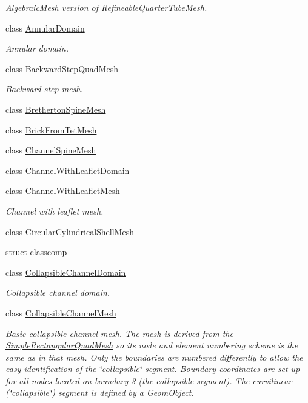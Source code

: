 \begin{DoxyCompactItemize}
\begin{DoxyCompactList}\small\item\em Algebraic\+Mesh version of \hyperlink{classoomph_1_1RefineableQuarterTubeMesh}{Refineable\+Quarter\+Tube\+Mesh}. \end{DoxyCompactList}\item 
class \hyperlink{classoomph_1_1AnnularDomain}{Annular\+Domain}
\begin{DoxyCompactList}\small\item\em Annular domain. \end{DoxyCompactList}\item 
class \hyperlink{classoomph_1_1BackwardStepQuadMesh}{Backward\+Step\+Quad\+Mesh}
\begin{DoxyCompactList}\small\item\em Backward step mesh. \end{DoxyCompactList}\item 
class \hyperlink{classoomph_1_1BrethertonSpineMesh}{Bretherton\+Spine\+Mesh}
\item 
class \hyperlink{classoomph_1_1BrickFromTetMesh}{Brick\+From\+Tet\+Mesh}
\item 
class \hyperlink{classoomph_1_1ChannelSpineMesh}{Channel\+Spine\+Mesh}
\item 
class \hyperlink{classoomph_1_1ChannelWithLeafletDomain}{Channel\+With\+Leaflet\+Domain}
\item 
class \hyperlink{classoomph_1_1ChannelWithLeafletMesh}{Channel\+With\+Leaflet\+Mesh}
\begin{DoxyCompactList}\small\item\em Channel with leaflet mesh. \end{DoxyCompactList}\item 
class \hyperlink{classoomph_1_1CircularCylindricalShellMesh}{Circular\+Cylindrical\+Shell\+Mesh}
\item 
struct \hyperlink{structoomph_1_1classcomp}{classcomp}
\item 
class \hyperlink{classoomph_1_1CollapsibleChannelDomain}{Collapsible\+Channel\+Domain}
\begin{DoxyCompactList}\small\item\em Collapsible channel domain. \end{DoxyCompactList}\item 
class \hyperlink{classoomph_1_1CollapsibleChannelMesh}{Collapsible\+Channel\+Mesh}
\begin{DoxyCompactList}\small\item\em Basic collapsible channel mesh. The mesh is derived from the {\ttfamily \hyperlink{classoomph_1_1SimpleRectangularQuadMesh}{Simple\+Rectangular\+Quad\+Mesh}} so it\textquotesingle{}s node and element numbering scheme is the same as in that mesh. Only the boundaries are numbered differently to allow the easy identification of the \char`\"{}collapsible\char`\"{} segment. Boundary coordinates are set up for all nodes located on boundary 3 (the collapsible segment). The curvilinear (\char`\"{}collapsible\char`\"{}) segment is defined by a {\ttfamily Geom\+Object}. \end{DoxyCompactList}\item 

\end{DoxyCompactItemize}
